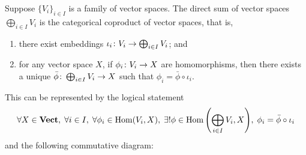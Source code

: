 \begin{definition}
    Suppose \({\{V_i\}}_{i \in I}\) is a family of vector spaces.
    The direct sum of vector spaces \(\bigoplus_{i \in I} V_i\)
    is the categorical coproduct of vector spaces, that is,
    \begin{enumerate}[label={(\roman*)}, itemsep=0mm]
        \item there exist embeddings \(\iota_i\colon V_i\to\bigoplus_{i \in I} V_i\); and
        \item for any vector space \(X\),
            if \(\phi_i\colon V_i\to X\) are homomorphisms,
            then there exists a unique \(\bar{\phi}\colon\bigoplus_{i \in I} V_i\to X\)
            such that \(\phi_i = \bar{\phi}\circ\iota_i\).
    \end{enumerate}

    This can be represented by the logical statement
    \begin{equation*}
        \forall X\in\mathbf{Vect},\;
        \forall i \in I,\; \forall \phi_i\in\operatorname{Hom}(V_i,X),\;
        \exists! \phi\in\operatorname{Hom}\qty(\bigoplus_{i \in I} V_i,X),\;
        \phi_i = \bar{\phi}\circ\iota_i
    \end{equation*}
    and the following commutative diagram:
    \begin{center}
    \end{center}
\end{definition}

